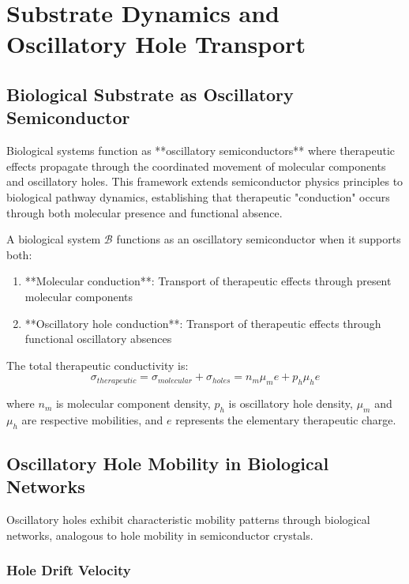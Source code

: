 \section{Substrate Dynamics and Oscillatory Hole Transport}

\subsection{Biological Substrate as Oscillatory Semiconductor}

Biological systems function as **oscillatory semiconductors** where therapeutic effects propagate through the coordinated movement of molecular components and oscillatory holes. This framework extends semiconductor physics principles to biological pathway dynamics, establishing that therapeutic "conduction" occurs through both molecular presence and functional absence.

\begin{definition}
A biological system $\mathcal{B}$ functions as an oscillatory semiconductor when it supports both:
\begin{enumerate}
\item **Molecular conduction**: Transport of therapeutic effects through present molecular components
\item **Oscillatory hole conduction**: Transport of therapeutic effects through functional oscillatory absences
\end{enumerate}

The total therapeutic conductivity is:
\begin{equation}
\sigma_{therapeutic} = \sigma_{molecular} + \sigma_{holes} = n_m \mu_m e + p_h \mu_h e
\end{equation}

where $n_m$ is molecular component density, $p_h$ is oscillatory hole density, $\mu_m$ and $\mu_h$ are respective mobilities, and $e$ represents the elementary therapeutic charge.
\end{definition}

\subsection{Oscillatory Hole Mobility in Biological Networks}

Oscillatory holes exhibit characteristic mobility patterns through biological networks, analogous to hole mobility in semiconductor crystals.

\subsubsection{Hole Drift Velocity}

